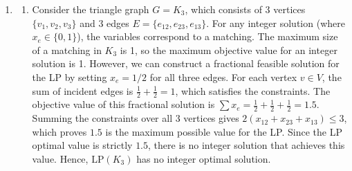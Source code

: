 \documentclass{article}
\begin{document}
\begin{enumerate}[label=\fbox{\arabic*}]
\begin{enumerate}[label=(\arabic*)]
          We can define a partial order $\le$ on $\mathbb{N}^n$ component-wise: $u \le v \iff u_i \le v_i$ for all $1 \le i \le n$. 
          The set of natural numbers $\mathbb{N}$ equipped with the standard $\le$ is clearly a well quasi-order. By repeated application of the result from part (1) (using induction on $n$), the Cartesian product $\mathbb{N}^n$ equipped with component-wise $\le$ is also a well quasi-order (this is Dickson's Lemma).
          
          Therefore, the infinite sequence $v(0), v(1), \dots$ in $\mathbb{N}^n$ must contain indices $j < k$ such that $v(j) \le v(k)$.
          By the definition of component-wise order, this means $\rho_i(s_j) \le \rho_i(s_k)$ for every $1 \le i \le n$.
          However, this directly contradicts the requirement that $\rho_i(s_j) > \rho_i(s_k)$ for at least one $i$. 
          This contradiction implies that no such infinite transition sequence can exist.
        \end{enumerate}

  \item %
        \begin{enumerate}[label=\arabic*.]
          \item Consider the triangle graph $G = K_3$, which consists of 3 vertices $\{v_1, v_2, v_3\}$ and 3 edges $E = \{e_{12}, e_{23}, e_{13}\}$.
          For any integer solution (where $x_e \in \{0, 1\}$), the variables correspond to a matching. The maximum size of a matching in $K_3$ is 1, so the maximum objective value for an integer solution is 1.
          However, we can construct a fractional feasible solution for the LP by setting $x_e = 1/2$ for all three edges.
          For each vertex $v \in V$, the sum of incident edges is $\frac{1}{2} + \frac{1}{2} = 1$, which satisfies the constraints.
          The objective value of this fractional solution is $\sum x_e = \frac{1}{2} + \frac{1}{2} + \frac{1}{2} = 1.5$.
          Summing the constraints over all 3 vertices gives $2(x_{12} + x_{23} + x_{13}) \le 3$, which proves $1.5$ is the maximum possible value for the LP.
          Since the LP optimal value is strictly $1.5$, there is no integer solution that achieves this value. Hence, $\mathrm{LP}(K_3)$ has no integer optimal solution.


\end{enumerate}
\end{enumerate}
\end{document}
